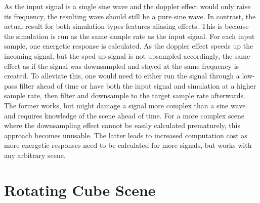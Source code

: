 As the input signal is a single sine wave and the doppler effect would only raise its frequency,
the resulting wave should still be a pure sine wave.
In contrast, the actual result for both simulation types features aliasing effects.
\newline
This is because the simulation is run as the same sample rate as the input signal.
For each input sample, one energetic response is calculated.
As the doppler effect speeds up the incoming signal,
but the sped up signal is not upsampled accordingly,
the same effect as if the signal was downsampled and stayed at the same frequency is created.
\newline
To alleviate this, one would need to either run the signal through a low-pass filter ahead of time
or have both the input signal and simulation at a higher sample rate,
then filter and downsample to the target sample rate afterwards.
\newline
The former works, but might damage a signal more complex than a sine wave
and requires knowledge of the scene ahead of time.
For a more complex scene where the downsampling effect cannot be easily calculated prematurely,
this approach becomes unusable.
\newline
The latter leads to increased computation cost as more energetic responses need to be calculated for more signals,
but works with any arbitrary scene.

\section{Rotating Cube Scene}

